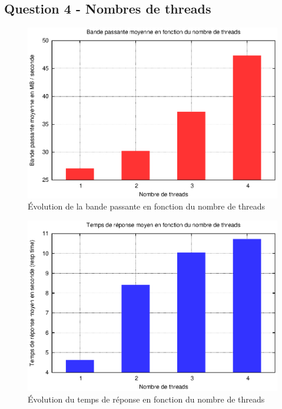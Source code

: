 \documentclass[a4paper]{article}
\begin{document}
\newpage
\subsection{Question 4 - Nombres de threads}

\begin{figure}[h]
	\begin{center}
		\includegraphics[scale=0.70]{Question4/bande_passante_moyenne.eps}
	\end{center}
   	\caption{Évolution de la bande passante en fonction du nombre de threads}
	\label{fig:courbe_bande_passante_thread}
\end{figure}

\FloatBarrier

\begin{figure}[h]
	\begin{center}
		\includegraphics[scale=0.70]{Question4/tps_resp_moyen.eps}
	\end{center}
   	\caption{Évolution du temps de réponse en fonction du nombre de threads}
	\label{fig:courbe_tps_rep_thread}
\end{figure}
\end{document}
